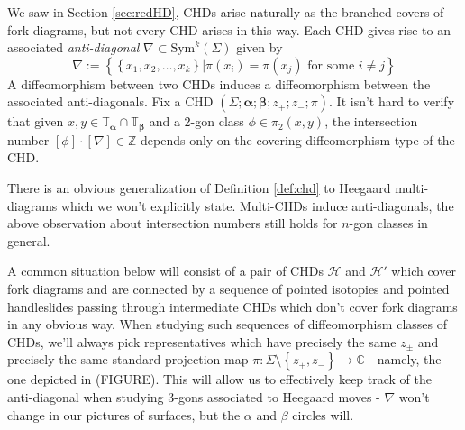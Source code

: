 \documentclass[11pt]{article}
\theoremstyle{plain} \newtheorem{thm}{Theorem}[subsection]
\theoremstyle{plain} \newtheorem{cor}[thm]{Corollary}
\theoremstyle{plain} \newtheorem{prop}[thm]{Proposition}
\theoremstyle{plain} \newtheorem{conj}[thm]{Conjecture}
\theoremstyle{plain} \newtheorem{lem}[thm]{Lemma}
\theoremstyle{definition} \newtheorem{df}[thm]{Definition}
\theoremstyle{remark} \newtheorem{rmk}[thm]{Remark}
\theoremstyle{remark} \newtheorem{obs}[thm]{Observation}
\newcommand{\h}{\mathcal{H}}
\newcommand{\ba}{\boldsymbol{\alpha}}
\newcommand{\bb}{\boldsymbol{\beta}}
\newcommand{\Ta}{\mathbb{T}_{\ba}}
\newcommand{\Tb}{\mathbb{T}_{\bb}}
\numberwithin{equation}{section}
\begin{document}
We saw in Section \ref{sec:redHD}, CHDs arise naturally as the branched covers of fork diagrams, but not every CHD arises in this way.  Each CHD gives rise to an associated \emph{anti-diagonal} $\nabla \subset \text{Sym}^{k}(\Sigma)$ given by
$$ \nabla := \left\{ \left\{ x_1, x_2, \ldots, x_k \right\} | \pi(x_i) = \pi(x_j) \text{ for some } i \neq j \right\}$$
A diffeomorphism between two CHDs induces a diffeomorphism between the associated anti-diagonals.  Fix a CHD $\left( \Sigma; \ba; \bb; z_+; z_-; \pi\right)$.  It isn't hard to verify that given $x,y \in \Ta \cap \Tb$ and a 2-gon class $\phi \in \pi_2(x,y)$,  the intersection number $[\phi] \cdot [\nabla] \in \mathbb{Z}$ depends only on the covering diffeomorphism type of the CHD.

There is an obvious generalization of Definition \ref{def:chd} to Heegaard multi-diagrams which we won't explicitly state.  Multi-CHDs induce anti-diagonals, the above observation about intersection numbers still holds for $n$-gon classes in general.

A common situation below will consist of a pair of CHDs $\h$ and $\h'$ which cover fork diagrams and are connected by a sequence of pointed isotopies and pointed handleslides passing through intermediate CHDs which don't cover fork diagrams in any obvious way.  When studying such sequences of diffeomorphism classes of CHDs, we'll always pick representatives which have precisely the same $z_{\pm}$ and precisely the same standard projection map $\pi: \Sigma\setminus \left\{ z_+, z_-\right\} \rightarrow \mathbb{C}$ - namely, the one depicted in (FIGURE).  This will allow us to effectively keep track of the anti-diagonal when studying 3-gons associated to Heegaard moves - $\nabla$ won't change in our pictures of surfaces, but the $\alpha$ and $\beta$ circles will.
\end{document}
